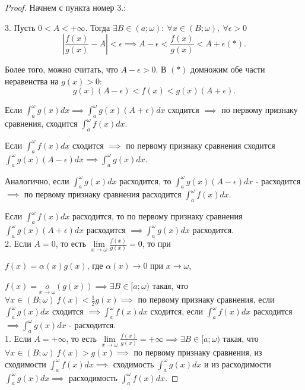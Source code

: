 \documentclass{report}
\theoremstyle{definition}
\begin{document}
\begin{proof}
  Начнем с пункта номер 3.:

  3. Пусть $0 < A < +\infty$. Тогда $\exists B \in (a;\omega): \ \forall x \in (B;\omega),
    \ \forall \epsilon > 0$
  \begin{equation*}
    | \frac{f(x)}{g(x)} - A | < \epsilon \implies A - \epsilon < \frac{f(x)}{g(x)} < A + \epsilon (*).
  \end{equation*}

  Более того, можно считать, что $A - \epsilon > 0$. В $(*)$ домножим обе части неравенства на $g(x) > 0$:
  \begin{equation*}
    g(x)(A - \epsilon) < f(x) < g(x)(A + \epsilon).
  \end{equation*}

  Если $\int_{a}^{\omega}g(x)dx \implies \int_{a}^{\omega}g(x)(A + \epsilon)dx$ сходится $\implies$ по
  первому признаку сравнения, сходится $\int_{a}^{\omega}f(x)dx$.

  Если $\int_{a}^{\omega}f(x)dx$ сходится
  $\implies$ по первому признаку сравнения сходится $\int_{a}^{\omega}g(x)(A - \epsilon)dx \implies
    \int_{a}^{\omega}g(x)dx$.

  Аналогично, если $\int_{a}^{\omega}g(x)dx$ расходится, то $\int_{a}^{\omega}g(x)
    (A - \epsilon)dx$ - расходится $\implies$ по первому признаку сравнения расходится $\int_{a}^{\omega}f(x)dx$.

  Если $\int_{a}^{\omega}f(x)dx$ расходится, то по первому признаку сравнения $\int_{a}^{\omega}g(x)(A +
    \epsilon)dx$ расходится $\implies \int_{a}^{\omega}g(x)dx$ расходится. \\

  2. Если $A = 0$, то есть $\underset{x\rightarrow\omega}{\lim}\frac{f(x)}{g(x)} = 0$, то при
  \begin{center}
    $f(x) = \alpha(x)g(x)$, где $\alpha(x)\rightarrow 0$ при $x \rightarrow \omega$,
  \end{center}
  $f(x) = \underset{x\rightarrow\omega}{o}(g(x)) \implies \exists B \in [a;\omega)$ такая, что $\forall x \in
    (B;\omega) \ f(x) < \frac{1}{2}g(x) \implies$ по первому признаку сравнения, если $\int_{a}^{\omega}g(x)dx$
  сходится $\implies \int_{a}^{\omega}f(x)dx$ сходится, если $\int_{a}^{\omega}f(x)dx$ расходится $\implies
    \int_{a}^{\omega}g(x)dx$ - расходится. \\

  1. Если $A = +\infty$, то есть $\underset{x\rightarrow\omega}{\lim}\frac{f(x)}{g(x)} = +\infty \implies
    \exists B \in [a;\omega)$ такая, что $\forall x \in (B;\omega) \ f(x) > g(x) \implies$ по первому признаку
  сравнения, из сходимости $\int_{a}^{\omega}f(x)dx \implies$ сходимость $\int_{a}^{\omega}g(x)dx$ и
  из расходимости $\int_{a}^{\omega}g(x)dx \implies$ расходимость $\int_{a}^{\omega}f(x)dx$.
\end{proof}
\end{document}
